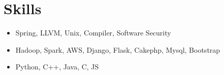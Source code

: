 \documentclass[a4paper,10pt]{article}
\begin{document}
\section{Skills}
\begin{itemize}
\item Spring, LLVM, Unix, Compiler, Software Security
\item Hadoop, Spark, AWS, Django, Flask, Cakephp, Mysql, Bootstrap
\item Python, C++, Java, C, JS
\end{itemize}



\end{document}
